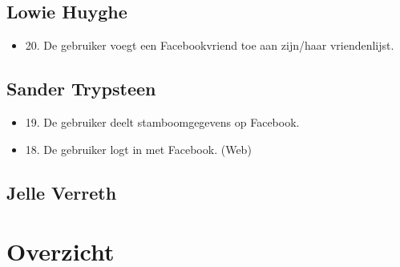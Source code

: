 \documentclass[pdftex,a4paper,12pt,twoside]{report}
\begin{document}
\subsection{Lowie Huyghe}
\begin{itemize}
\item 20. De gebruiker voegt een Facebookvriend toe aan zijn/haar vriendenlijst. 
\end{itemize}
\subsection{Sander Trypsteen}
\begin{itemize}
\item 19. De gebruiker deelt stamboomgegevens op Facebook. 
\item 18. De gebruiker logt in met Facebook.  (Web)
\end{itemize}
\subsection{Jelle Verreth}

\section{Overzicht}
\end{document}
